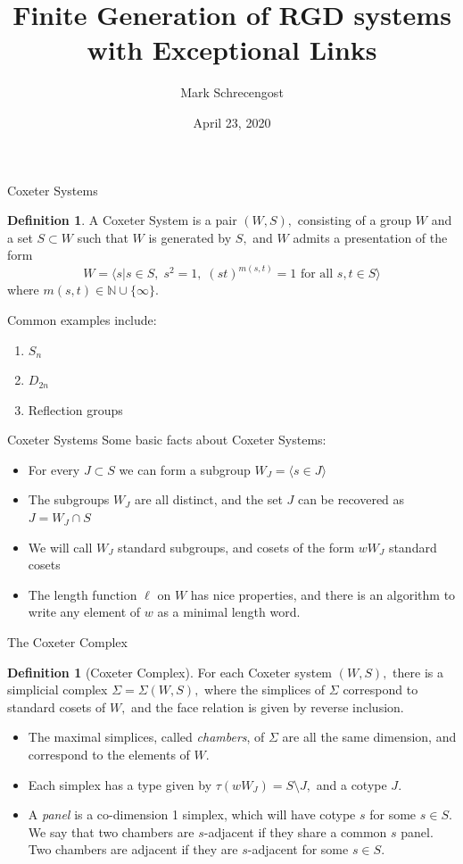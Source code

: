 \documentclass[xcolor=dvipsnames]{beamer}
\title[RGD Systems with Exceptional Links]{Finite Generation of RGD systems with Exceptional Links}
\author{Mark Schrecengost}
\institute{Department of Mathematics\\University of Virginia}
\date{April 23, 2020}
\theoremstyle{definition}
\newtheorem{defn}[Theo]{Definition}
\begin{document}
\begin{frame}
  \titlepage
\end{frame}

\begin{frame}{Coxeter Systems}
	\begin{defn}
		A Coxeter System is a pair $(W,S),$ consisting of a group $W$ and a set $S\subset W$ such that $W$ is generated by $S,$ and $W$ admits a presentation of the form
		\[
			W=\langle s|s\in S,\;s^2=1,\;(st)^{m(s,t)}=1\text{ for all }s,t\in S\rangle
		\]
		where $m(s,t)\in \mathbb{N}\cup\{\infty\}.$
	\end{defn}
	\pause
	Common examples include:
	\begin{enumerate}
		\item $S_n$
		\item $D_{2n}$
		\item Reflection groups
	\end{enumerate}
\end{frame}

\begin{frame}{Coxeter Systems}
Some basic facts about Coxeter Systems:
\begin{itemize}
	\pause
\item For every $J\subset S$ we can form a subgroup $W_J=\langle s\in J\rangle$
	\pause
\item The subgroups $W_J$ are all distinct, and the set $J$ can be recovered as $J=W_J\cap S$
	\pause
\item We will call $W_J$ standard subgroups, and cosets of the form $wW_J$ standard cosets
	\pause
\item The length function $\ell$ on $W$ has nice properties, and there is an algorithm to write any element of $w$ as a minimal length word.
\end{itemize}
\end{frame}

\begin{frame}{The Coxeter Complex}
	\begin{defn}[Coxeter Complex]
		For each Coxeter system $(W,S),$ there is a simplicial complex $\Sigma=\Sigma(W,S),$ where the simplices of $\Sigma$ correspond to standard cosets of $W,$ and the face relation is given by reverse inclusion.
	\end{defn}
	\begin{itemize}
		\pause
	\item The maximal simplices, called \emph{chambers}, of $\Sigma$ are all the same dimension, and correspond to the elements of $W.$
			\pause
		\item Each simplex has a type given by $\tau(wW_J)=S\setminus J,$ and a cotype $J.$
			\pause
		\item A \emph{panel} is a co-dimension 1 simplex, which will have cotype $s$ for some $s\in S.$ We say that two chambers are $s$-adjacent if they share a common $s$ panel. Two chambers are adjacent if they are $s$-adjacent for some $s\in S.$
	\end{itemize}
\end{frame}
\end{document}
